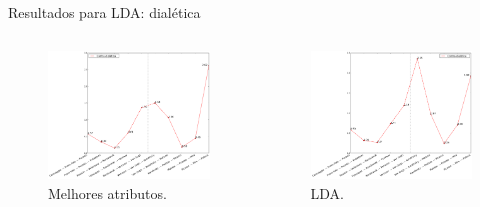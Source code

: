 \documentclass{beamer}
\begin{document}
\begin{frame}{Resultados para LDA: dialética}

  \begin{columns}

   \begin{column}{.49\textwidth}
\begin{figure}[h!]
\begin{center}
\includegraphics[width=\columnwidth]{figs/caso1_dialetica}
        \caption{Melhores atributos.}
\end{center}
\end{figure}
\end{column}


    \begin{column}{.49\textwidth}
\begin{figure}[h!]
\begin{center}
\includegraphics[width=\columnwidth]{figs/caso3_dialetica}
        \caption{LDA.}
\end{center}
\end{figure}
\end{column}
\end{columns}

\end{frame}
\end{document}
